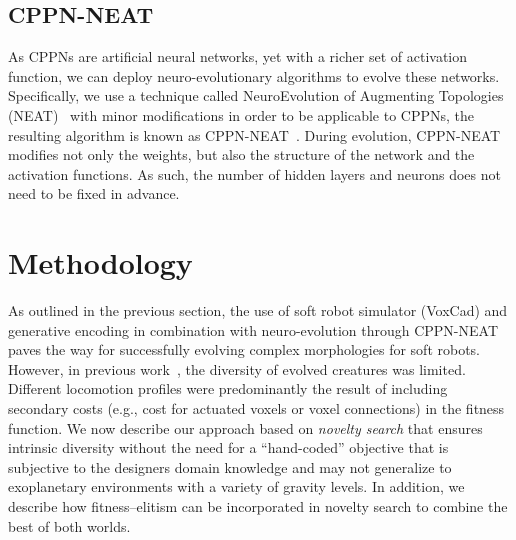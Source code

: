 \documentclass{sig-alternate}
\begin{document}
\newpage
\subsection{CPPN-NEAT}
As CPPNs are artificial neural networks, yet with a richer set of activation function, we can deploy neuro-evolutionary algorithms to evolve these networks. Specifically, we use a technique called NeuroEvolution of Augmenting Topologies (NEAT)~\cite{stanley2002evolving} with minor modifications in order to be applicable to CPPNs, the resulting algorithm is known as CPPN-NEAT~\cite{stanley2007compositional}. During evolution, CPPN-NEAT modifies not only the weights, but also the structure of the network and the activation functions. As such, the number of hidden layers and neurons does not need to be fixed in advance.

\section{Methodology}
As outlined in the previous section, the use of soft robot simulator (VoxCad) and generative encoding in combination with neuro-evolution through CPPN-NEAT paves the way for successfully evolving complex morphologies for soft robots. However, in previous work~\cite{cheney2013unshackling}, the diversity of evolved creatures was limited. Different locomotion profiles were predominantly the result of including secondary costs (e.g., cost for actuated voxels or voxel connections) in the fitness function. We now describe our approach based on \textit{novelty search} that ensures intrinsic diversity without the need for a ``hand-coded'' objective that is subjective to the designers domain knowledge and may not generalize to exoplanetary environments with a variety of gravity levels. In addition, we describe how fitness--elitism can be incorporated in novelty search to combine the best of both worlds.
\end{document}
